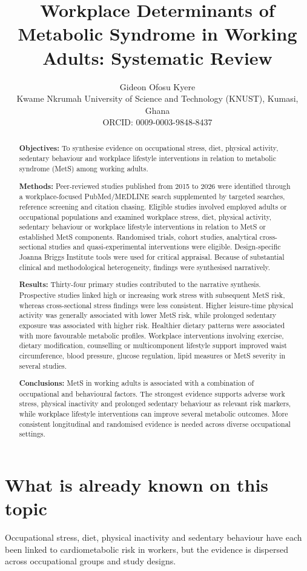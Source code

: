 \documentclass[11pt]{article}
\title{Workplace Determinants of Metabolic Syndrome in Working Adults: Systematic Review}
\author{Gideon Ofosu Kyere\\
Kwame Nkrumah University of Science and Technology (KNUST), Kumasi, Ghana\\
ORCID: 0009-0003-9848-8437}
\date{}
\begin{document}
\maketitle

\begin{abstract}
\textbf{Objectives:} To synthesise evidence on occupational stress, diet, physical activity, sedentary behaviour and workplace lifestyle interventions in relation to metabolic syndrome (MetS) among working adults.

\textbf{Methods:} Peer-reviewed studies published from 2015 to 2026 were identified through a workplace-focused PubMed/MEDLINE search supplemented by targeted searches, reference screening and citation chasing. Eligible studies involved employed adults or occupational populations and examined workplace stress, diet, physical activity, sedentary behaviour or workplace lifestyle interventions in relation to MetS or established MetS components. Randomised trials, cohort studies, analytical cross-sectional studies and quasi-experimental interventions were eligible. Design-specific Joanna Briggs Institute tools were used for critical appraisal. Because of substantial clinical and methodological heterogeneity, findings were synthesised narratively.

\textbf{Results:} Thirty-four primary studies contributed to the narrative synthesis. Prospective studies linked high or increasing work stress with subsequent MetS risk, whereas cross-sectional stress findings were less consistent. Higher leisure-time physical activity was generally associated with lower MetS risk, while prolonged sedentary exposure was associated with higher risk. Healthier dietary patterns were associated with more favourable metabolic profiles. Workplace interventions involving exercise, dietary modification, counselling or multicomponent lifestyle support improved waist circumference, blood pressure, glucose regulation, lipid measures or MetS severity in several studies.

\textbf{Conclusions:} MetS in working adults is associated with a combination of occupational and behavioural factors. The strongest evidence supports adverse work stress, physical inactivity and prolonged sedentary behaviour as relevant risk markers, while workplace lifestyle interventions can improve several metabolic outcomes. More consistent longitudinal and randomised evidence is needed across diverse occupational settings.
\end{abstract}

\section*{What is already known on this topic}
Occupational stress, diet, physical inactivity and sedentary behaviour have each been linked to cardiometabolic risk in workers, but the evidence is dispersed across occupational groups and study designs.
\end{document}
